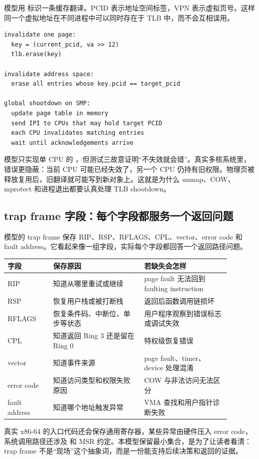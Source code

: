 模型用  标识一条缓存翻译。PCID 表示地址空间标签，VPN 表示虚拟页号。这样同一个虚拟地址在不同进程中可以同时存在于 TLB 中，而不会互相误用。

\begin{lstlisting}
invalidate one page:
  key = (current_pcid, va >> 12)
  tlb.erase(key)

invalidate address space:
  erase all entries whose key.pcid == target_pcid

global shootdown on SMP:
  update page table in memory
  send IPI to CPUs that may hold target PCID
  each CPU invalidates matching entries
  wait until acknowledgements arrive
\end{lstlisting}

模型只实现单 CPU 的 ，但测试三故意证明“不失效就会错”。真实多核系统里，错误更隐蔽：当前 CPU 可能已经失效了，另一个 CPU 仍持有旧权限。物理页被释放复用后，旧翻译就可能写到新对象上。这就是为什么 unmap、COW、mprotect 和进程退出都要认真处理 TLB shootdown。

\subsection{trap frame 字段：每个字段都服务一个返回问题}

模型的 trap frame 保存 RIP、RSP、RFLAGS、CPL、vector、error code 和 fault address。它看起来像一组字段，实际每个字段都回答一个返回路径问题。

\begin{longtable}{p{0.18\linewidth}p{0.36\linewidth}p{0.34\linewidth}}
\toprule
字段 & 保存原因 & 若缺失会怎样 \\
\midrule
RIP & 知道从哪里重试或继续 & page fault 无法回到 faulting instruction \\
RSP & 恢复用户栈或被打断栈 & 返回后函数调用链损坏 \\
RFLAGS & 恢复条件码、中断位、单步等状态 & 用户程序观察到错误标志或调试失效 \\
CPL & 知道返回 Ring 3 还是留在 Ring 0 & 特权级恢复错误 \\
vector & 知道事件来源 & page fault、timer、device 处理混淆 \\
error code & 知道访问类型和权限失败原因 & COW 与非法访问无法区分 \\
fault address & 知道哪个地址触发异常 & VMA 查找和用户指针诊断失败 \\
\bottomrule
\end{longtable}

真实 x86-64 的入口代码还会保存通用寄存器，某些异常由硬件压入 error code，系统调用路径还涉及  和 MSR 约定。本模型保留最小集合，是为了让读者看清：trap frame 不是“现场”这个抽象词，而是一份能支持后续决策和返回的证据。

